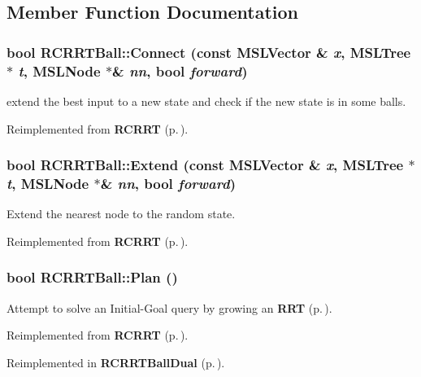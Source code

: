 \subsection{Member Function Documentation}
\subsubsection{\setlength{\rightskip}{0pt plus 5cm}bool RCRRTBall::Connect (const {\bf MSLVector} \& {\em x}, {\bf MSLTree} $\ast$ {\em t}, {\bf MSLNode} $\ast$\& {\em nn}, bool {\em forward})\hspace{0.3cm}{\tt  [virtual]}}\label{classRCRRTBall_a4}


extend the best input to a new state and check if the new state is in some balls.



Reimplemented from {\bf RCRRT} {\rm (p.\,\pageref{classRCRRT_a9})}.
\subsubsection{\setlength{\rightskip}{0pt plus 5cm}bool RCRRTBall::Extend (const {\bf MSLVector} \& {\em x}, {\bf MSLTree} $\ast$ {\em t}, {\bf MSLNode} $\ast$\& {\em nn}, bool {\em forward})\hspace{0.3cm}{\tt  [virtual]}}\label{classRCRRTBall_a3}


Extend the nearest node to the random state.



Reimplemented from {\bf RCRRT} {\rm (p.\,\pageref{classRCRRT_a7})}.
\subsubsection{\setlength{\rightskip}{0pt plus 5cm}bool RCRRTBall::Plan ()\hspace{0.3cm}{\tt  [virtual]}}\label{classRCRRTBall_a5}


Attempt to solve an Initial-Goal query by growing an {\bf RRT} {\rm (p.\,\pageref{classRRT})}.



Reimplemented from {\bf RCRRT} {\rm (p.\,\pageref{classRCRRT_a10})}.

Reimplemented in {\bf RCRRTBall\-Dual} {\rm (p.\,\pageref{classRCRRTBallDual_a2})}.
